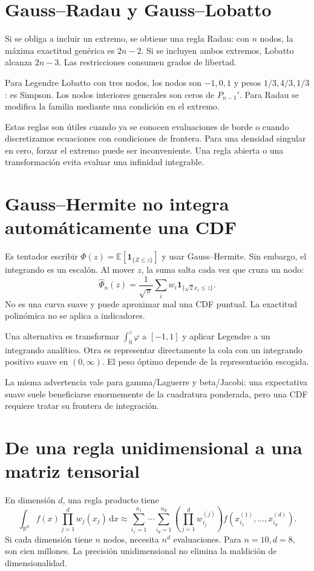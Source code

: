 \documentclass[11pt,a4paper]{article}
\newcommand{\R}{\mathbb R}
\newcommand{\E}{\mathbb E}
\newcommand{\ind}{\mathbf 1}
\newcommand{\dd}{\,\mathrm d}
\theoremstyle{definition}
\newcommand{\ph}{\varphi}
\begin{document}
\section{Gauss--Radau y Gauss--Lobatto}
Si se obliga a incluir un extremo, se obtiene una regla Radau: con $n$ nodos, la máxima exactitud genérica es $2n-2$. Si se incluyen ambos extremos, Lobatto alcanza $2n-3$. Las restricciones consumen grados de libertad.

Para Legendre Lobatto con tres nodos, los nodos son $-1,0,1$ y pesos $1/3,4/3,1/3$: es Simpson. Los nodos interiores generales son ceros de $P_{n-1}'$. Para Radau se modifica la familia mediante una condición en el extremo.

Estas reglas son útiles cuando ya se conocen evaluaciones de borde o cuando discretizamos ecuaciones con condiciones de frontera. Para una densidad singular en cero, forzar el extremo puede ser inconveniente. Una regla abierta o una transformación evita evaluar una infinidad integrable.

\section{Gauss--Hermite no integra automáticamente una CDF}
Es tentador escribir
$\Phi(z)=\E[\ind_{\{Z\le z\}}]$ y usar Gauss--Hermite. Sin embargo, el integrando es un escalón. Al mover $z$, la suma salta cada vez que cruza un nodo:
\[
\widehat\Phi_n(z)=\frac1{\sqrt\pi}\sum_iw_i
\ind_{\{\sqrt2x_i\le z\}}.
\]
No es una curva suave y puede aproximar mal una CDF puntual. La exactitud polinómica no se aplica a indicadores.

Una alternativa es transformar $\int_0^z\ph$ a $[-1,1]$ y aplicar Legendre a un integrando analítico. Otra es representar directamente la cola con un integrando positivo suave en $(0,\infty)$. El peso óptimo depende de la representación escogida.

La misma advertencia vale para gamma/Laguerre y beta/Jacobi: una expectativa suave suele beneficiarse enormemente de la cuadratura ponderada, pero una CDF requiere tratar su frontera de integración.

\section{De una regla unidimensional a una matriz tensorial}
En dimensión $d$, una regla producto tiene
\[
\int_{\R^d}f(x)\prod_{j=1}^dw_j(x_j)\dd x
\approx\sum_{i_1=1}^{n_1}\cdots\sum_{i_d=1}^{n_d}
\left(\prod_{j=1}^dw_{i_j}^{(j)}\right)
f(x_{i_1}^{(1)},\ldots,x_{i_d}^{(d)}).
\]
Si cada dimensión tiene $n$ nodos, necesita $n^d$ evaluaciones. Para $n=10,d=8$, son cien millones. La precisión unidimensional no elimina la maldición de dimensionalidad.
\end{document}
